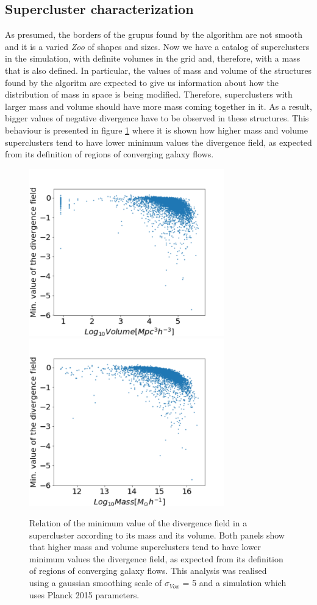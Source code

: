 \documentclass[usenatbib]{mnras}
\begin{document}
\subsection{Supercluster characterization}

As presumed, the borders of the grupus found by the algorithm are not smooth and it is a varied \emph{Zoo} of shapes and sizes. Now we have a catalog of superclusters in the simulation, with definite volumes in the grid and, therefore, with a mass that is also defined. In particular, the values of mass and volume of the structures found by the algoritm are expected to give us information about how the distribution of mass in space is being modified. Therefore, superclusters with larger mass and volume should have more mass coming together in it. As a result, bigger values of negative divergence have to be observed in these structures. This behaviour is presented in figure \ref{fig:min_div} where it is shown how higher mass and volume superclusters tend to have lower minimum values the divergence field, as expected from its definition of regions of converging galaxy flows. 


\begin{figure}
    \centering
    \includegraphics[width=240pt]{min_div_volume.pdf}
    \includegraphics[width=240pt]{min_div_mass.pdf}
    \caption{Relation of the minimum value of the divergence field in a supercluster according to its mass and its volume. Both panels show that higher mass and volume superclusters tend to have lower minimum values the divergence field, as expected from its definition of regions of converging galaxy flows. This analysis was realised using a gaussian smoothing scale of $\sigma_{Vox}$ = 5 and a simulation which uses Planck 2015 parameters.}
    \label{fig:min_div}
\end{figure}
\end{document}
